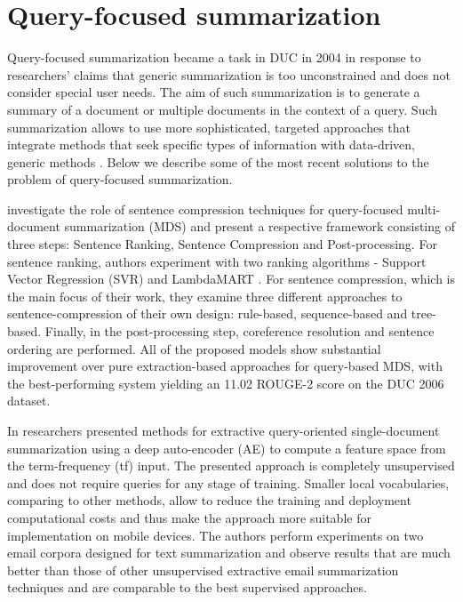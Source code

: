 \documentclass[11pt,a4paper,onecolumn]{article}
\begin{document}
\section{Query-focused summarization}
Query-focused summarization became a task in DUC in 2004 in response to researchers' claims that generic summarization is too unconstrained and does not consider special user needs.
The aim of such summarization is to generate a summary of a document or multiple documents in the context of a query.
Such summarization allows to use more sophisticated, targeted approaches that integrate methods that seek specific types of information with data-driven, generic methods \cite{nenkova2011automatic}.
Below we describe some of the most recent solutions to the problem of query-focused summarization.

 investigate the role of sentence compression techniques for query-focused multi-document summarization (MDS) and present a respective framework consisting of three steps: Sentence Ranking, Sentence Compression and Post-processing.
For sentence ranking, authors experiment with two ranking algorithms - Support Vector Regression (SVR) \cite{mozer1997} and LambdaMART \cite{burges2007learning}.
For sentence compression, which is the main focus of their work, they examine three different approaches to sentence-compression of their own design: rule-based, sequence-based and tree-based.
Finally, in the post-processing step, coreference resolution and sentence ordering are performed.
All of the proposed models show substantial improvement over pure extraction-based approaches for query-based MDS, with the best-performing system yielding an 11.02 ROUGE-2 score on the DUC 2006 dataset.

In \cite{yousefi2017text} researchers presented methods for extractive query-oriented single-document summarization using a deep auto-encoder (AE) to compute a feature space from the term-frequency (tf) input.
The presented approach is completely unsupervised and does not require queries for any stage of training.
Smaller local vocabularies, comparing to other methods, allow to reduce the training and deployment computational costs and thus make the approach more suitable for implementation on mobile devices.
The authors perform experiments on two email corpora designed for text summarization and observe results that are much better than those of other unsupervised extractive email summarization techniques and are comparable to the best supervised approaches.
\end{document}

